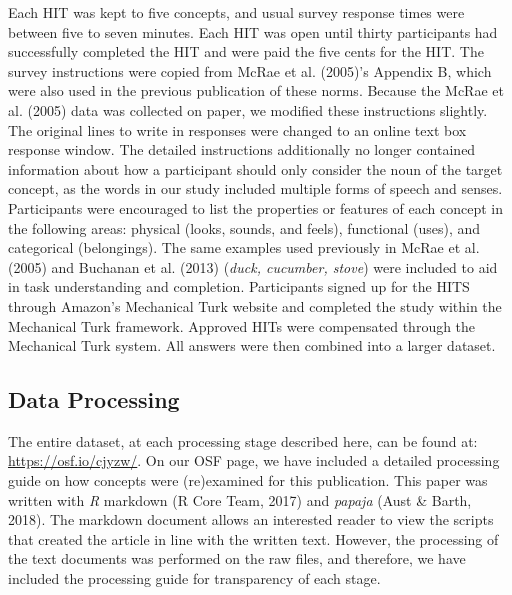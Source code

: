 \documentclass[english,man]{apa6}
\theoremstyle{definition}
\theoremstyle{definition}
\theoremstyle{definition}
\theoremstyle{remark}
\begin{document}
Each HIT was kept to five concepts, and usual survey response times were
between five to seven minutes. Each HIT was open until thirty
participants had successfully completed the HIT and were paid the five
cents for the HIT. The survey instructions were copied from McRae et al.
(2005)'s Appendix B, which were also used in the previous publication of
these norms. Because the McRae et al. (2005) data was collected on
paper, we modified these instructions slightly. The original lines to
write in responses were changed to an online text box response window.
The detailed instructions additionally no longer contained information
about how a participant should only consider the noun of the target
concept, as the words in our study included multiple forms of speech and
senses. Participants were encouraged to list the properties or features
of each concept in the following areas: physical (looks, sounds, and
feels), functional (uses), and categorical (belongings). The same
examples used previously in McRae et al. (2005) and Buchanan et al.
(2013) (\emph{duck, cucumber, stove}) were included to aid in task
understanding and completion. Participants signed up for the HITS
through Amazon's Mechanical Turk website and completed the study within
the Mechanical Turk framework. Approved HITs were compensated through
the Mechanical Turk system. All answers were then combined into a larger
dataset.

\subsection{Data Processing}\label{data-processing}

The entire dataset, at each processing stage described here, can be
found at: \url{https://osf.io/cjyzw/}. On our OSF page, we have included
a detailed processing guide on how concepts were (re)examined for this
publication. This paper was written with \emph{R} markdown (R Core Team,
2017) and \emph{papaja} (Aust \& Barth, 2018). The markdown document
allows an interested reader to view the scripts that created the article
in line with the written text. However, the processing of the text
documents was performed on the raw files, and therefore, we have
included the processing guide for transparency of each stage.
\end{document}
